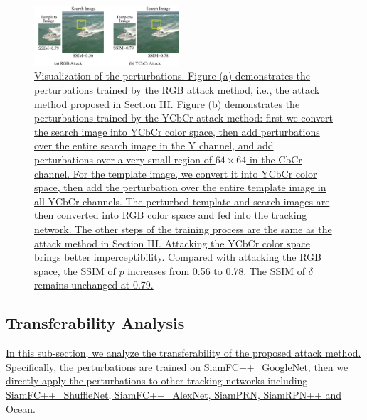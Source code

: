 \documentclass[journal]{IEEEtran}
\begin{document}
\begin{figure}[t]
  \centering
  \includegraphics[width=0.48\textwidth]{images_imperceptible/1.pdf}
  \caption{\uline{Visualization of the perturbations.
  Figure (a) demonstrates the perturbations trained by the RGB attack method, i.e., the attack method proposed in Section III.
  Figure (b) demonstrates the perturbations trained by the YCbCr attack method: first we convert the search image into YCbCr color space, then add perturbations over the entire search image in the Y channel, and add perturbations over a very small region of $64 \times 64$ in the CbCr channel. 
  For the template image, we convert it into YCbCr color space, then add the perturbation over the entire template image in all YCbCr channels.
  The perturbed template and search images are then converted into RGB color space and fed into the tracking network.
  The other steps of the training process are the same as the attack method in Section III.
  Attacking the YCbCr color space brings better imperceptibility. Compared with attacking the RGB space, the SSIM of $p$ increases from 0.56 to 0.78. The SSIM of $\delta$ remains unchanged at 0.79.}
  }
  \label{fig:YCbCr}
\end{figure}

\subsection{Transferability Analysis}

\uline{In this sub-section, we analyze the transferability of the proposed attack method. Specifically, the perturbations are trained on SiamFC++\_GoogleNet, then we directly apply the perturbations to other tracking networks including SiamFC++\_ShuffleNet, SiamFC++\_AlexNet, SiamPRN, SiamRPN++ and Ocean.}
\end{document}
